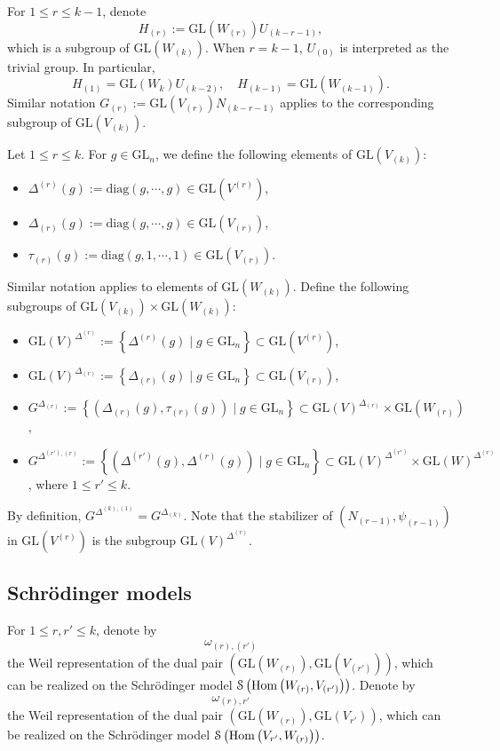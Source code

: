 \documentclass[11pt,reqno]{amsart}
\renewcommand{\1}{{\mathbf{1}}} \newcommand{\sB}{{\mathscr{B}}}
\newcommand{\CS}{{\mathcal {S}}} \newcommand{\CT}{{\mathcal {T}}}
\newcommand{\diag}{{\mathrm{diag}}}\renewcommand{\d}{{\mathrm{d}}}
\newcommand{\GL}{{\mathrm{GL}}}\newcommand{\G}{{\mathrm{G}}}
\theoremstyle{plain}
\theoremstyle{definition}
\numberwithin{equation}{section}
\begin{document}
For $1\leq r\leq k-1$, denote 
$$H_{(r)}:=\GL(W_{(r)})U_{(k-r-1)},$$ which is a subgroup of $\GL(W_{(k)})$. When $r=k-1$, $U_{(0)}$ is interpreted as the trivial group. In particular,
$$H_{(1)}=\GL(W_k)U_{(k-2)},\quad H_{(k-1)}=\GL(W_{(k-1)}).$$
Similar notation $G_{(r)}:=\GL(V_{(r)})N_{(k-r-1)}$ applies to the corresponding subgroup of $\GL(V_{(k)})$.

Let $1\leq r\leq k$. For $g\in\GL_n$, we define the following elements of $\GL(V_{(k)})$:
\begin{itemize}
\item $\Delta^{(r)}(g):=\diag(g,\cdots,g)\in\GL(V^{(r)})$,
\item $\Delta_{(r)}(g):=\diag(g,\cdots,g)\in\GL(V_{(r)})$,
\item $\tau_{(r)}(g):=\diag(g,1,\cdots,1)\in\GL(V_{(r)})$.
\end{itemize}
Similar notation applies to elements of $\GL(W_{(k)})$. Define the following subgroups of $\GL(V_{(k)})\times\GL(W_{(k)})$:
\begin{itemize}
\item $\GL(V)^{\Delta^{(r)}}:=\left\{\Delta^{(r)}(g)\mid g\in\GL_n\right\}\subset\GL(V^{(r)})$,
\item $\GL(V)^{\Delta_{(r)}}:=\left\{\Delta_{(r)}(g)\mid g\in\GL_n\right\}\subset\GL(V_{(r)})$,
\item $G^{\Delta_{(r)}}:=\left\{\left(\Delta_{(r)}(g),\tau_{(r)}(g)\right)\mid g\in\GL_n\right\}\subset\GL(V)^{\Delta_{(r)}}\times\GL(W_{(r)})$,
\item  $G^{\Delta^{(r'),(r)}}:=\left\{\left(\Delta^{(r')}(g),\Delta^{(r)}(g)\right)\mid g\in\GL_n\right\}\subset\GL(V)^{\Delta^{(r')}}\times\GL(W)^{\Delta^{(r)}}$, where $1\leq r'\leq k$.
\end{itemize}
By definition, $G^{\Delta^{(k),(1)}}=G^{\Delta_{(k)}}$.
Note that the stabilizer of $\left(N_{(r-1)},\psi_{(r-1)}\right)$ in $\GL(V^{(r)})$ is the subgroup $\GL(V)^{\Delta^{(r)}}$.



\subsection{Schrödinger models} For $1\leq r,r'\leq k$, denote by $$\omega_{(r),(r')}$$ the Weil representation of the dual pair $(\GL(W_{(r)}),\GL(V_{(r')}))$, which can be realized on the Schrödinger model $\CS\left(\Hom\left(W_{(r)},V_{(r')}\right)\right)$. Denote by $$\omega_{(r), r'}$$ the Weil representation of the dual pair $(\GL(W_{(r)}),\GL(V_{r'}))$, which can be realized on the Schrödinger model $\CS\left(\Hom\left(V_{r'},W_{(r)}\right)\right)$.
\end{document}
